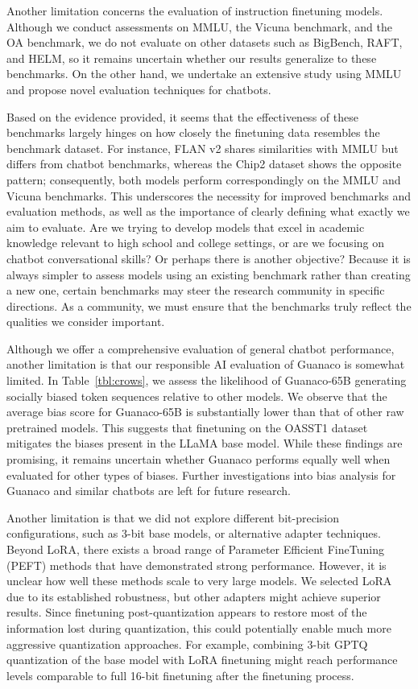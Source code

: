 Another limitation concerns the evaluation of instruction finetuning models. Although we conduct assessments on MMLU, the Vicuna benchmark, and the OA benchmark, we do not evaluate on other datasets such as BigBench, RAFT, and HELM, so it remains uncertain whether our results generalize to these benchmarks. On the other hand, we undertake an extensive study using MMLU and propose novel evaluation techniques for chatbots.

Based on the evidence provided, it seems that the effectiveness of these benchmarks largely hinges on how closely the finetuning data resembles the benchmark dataset. For instance, FLAN v2 shares similarities with MMLU but differs from chatbot benchmarks, whereas the Chip2 dataset shows the opposite pattern; consequently, both models perform correspondingly on the MMLU and Vicuna benchmarks. This underscores the necessity for improved benchmarks and evaluation methods, as well as the importance of clearly defining what exactly we aim to evaluate. Are we trying to develop models that excel in academic knowledge relevant to high school and college settings, or are we focusing on chatbot conversational skills? Or perhaps there is another objective? Because it is always simpler to assess models using an existing benchmark rather than creating a new one, certain benchmarks may steer the research community in specific directions. As a community, we must ensure that the benchmarks truly reflect the qualities we consider important.

Although we offer a comprehensive evaluation of general chatbot performance, another limitation is that our responsible AI evaluation of {Guanaco} is somewhat limited. In Table~\ref{tbl:crows}, we assess the likelihood of {Guanaco}-65B generating socially biased token sequences relative to other models. We observe that the average bias score for {Guanaco}-65B is substantially lower than that of other raw pretrained models. This suggests that finetuning on the OASST1 dataset mitigates the biases present in the LLaMA base model. While these findings are promising, it remains uncertain whether {Guanaco} performs equally well when evaluated for other types of biases. Further investigations into bias analysis for {Guanaco} and similar chatbots are left for future research.

Another limitation is that we did not explore different bit-precision configurations, such as 3-bit base models, or alternative adapter techniques. Beyond LoRA, there exists a broad range of Parameter Efficient FineTuning (PEFT) methods that have demonstrated strong performance. However, it is unclear how well these methods scale to very large models. We selected LoRA due to its established robustness, but other adapters might achieve superior results. Since finetuning post-quantization appears to restore most of the information lost during quantization, this could potentially enable much more aggressive quantization approaches. For example, combining 3-bit GPTQ quantization of the base model with LoRA finetuning might reach performance levels comparable to full 16-bit finetuning after the finetuning process.


